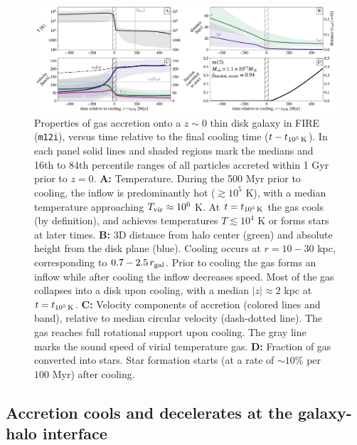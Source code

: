 \documentclass[fleqn,usenatbib]{mnras}
\newcommand{\tcools}{t_{10^5\,{\rm K}}}
\newcommand{\Tvir}{T_{\rm vir}}
\begin{document}
\begin{figure}
\includegraphics[width=\textwidth]{figures/before_and_after/before_and_after_characteristics_m12i_md.pdf}
\caption{
Properties of gas accretion onto a $z\sim0$ thin disk galaxy in FIRE (\texttt{m12i}), versus time relative to the final cooling time ($t - \tcools$).
In each panel solid lines and shaded regions mark the medians and 16th to 84th percentile ranges of all particles accreted within 1 Gyr prior to $z=0$. 
\textbf{A:}
Temperature.
During the 500 Myr prior to cooling, the inflow is predominantly hot ($\gtrsim 10^5$ K), with a median temperature approaching $\Tvir\approx10^6$ K.
At $t = \tcools$ the gas cools (by definition), and achieves  temperatures $T\lesssim10^4$ K or forms stars at later times.
\textbf{B:}
3D distance from halo center (green) and absolute height from the disk plane (blue).
Cooling occurs at $r=10-30$ kpc, corresponding to $0.7-2.5\,r_{\rm gal}$.
Prior to cooling the gas forms an inflow while after cooling the inflow decreases speed.
Most of the gas collapses into a disk upon cooling, with a median $\vert z \vert \approx 2$ kpc at $t=\tcools$.
\textbf{C:}
Velocity components of accretion (colored lines and band), relative to median circular velocity (dash-dotted line).
The gas reaches full rotational support upon cooling.
The gray line marks the sound speed of virial temperature gas.
\textbf{D:}
Fraction of gas converted into stars.
Star formation starts (at a rate of $\sim10\%$ per $100$ Myr) after cooling.
}
\label{f: before and after A}
\end{figure}


\subsection{Accretion cools and decelerates at the galaxy-halo interface}
\label{s: characteristics -- cools}
\end{document}
